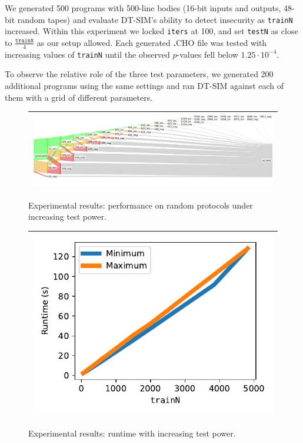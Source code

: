 \documentclass[compsoc, conference, a4paper, 10pt, times]{IEEEtran}
\newcommand{\langname}{\textsc{\textbf{.}CHO}\xspace}
\newcommand{\toolname}{\textsc{DT-SIM}\xspace}
\begin{document}
We generated 500 programs with 500-line bodies (16-bit inputs and outputs, 48-bit random tapes)
and evaluate \toolname's ability to detect insecurity as \texttt{trainN} increased.
Within this experiment we locked \texttt{iters} at 100, and set \texttt{testN} as close to $\frac{\mathtt{trainN}}{4}$ as our setup allowed.
Each generated \langname file was tested with increasing values of \texttt{trainN} until the observed $p$-values fell below $1.25 \cdot 10^{-4}$.

To observe the relative role of the three test parameters, we generated 200 additional programs using the same settings
and ran \toolname against each of them with a grid of different parameters.


\begin{figure}
  \label{fig:sankey}
  \centering
  \newcommand{\gsize}{.9\textwidth}
\begin{tabular}{c}
    \hline\hline
    \includegraphics[width=\gsize]{graphs/medium2.old.pdf} \\
    \hline
    \hline
\end{tabular}
\caption{Experimental results: performance on random protocols under increasing test power.}
\end{figure}

\begin{figure}
  \label{fig:linear-time}
  \centering
  \newcommand{\gsize}{.38\textwidth}
\begin{tabular}{c}
    \hline\hline
    \includegraphics[width=\gsize]{graphs/asymptote_time.pdf} \\
    \hline
    \hline
\end{tabular}
\caption{Experimental results: runtime with increasing test power.}
\end{figure}
\end{document}
